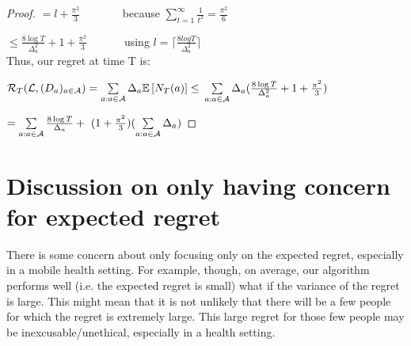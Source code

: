 \documentclass[11pt]{article}
\begin{document}
\begin{proof}
$= l + \frac{\pi^2}{3}$ \ \ \ \ \  \ \ {\small because $\sum\limits^\infty_{t = 1} \frac{1}{t^2} = \frac{\pi^2}{6}$}

$\leq \frac{8 \log T}{\Delta_a^2} + 1 + \frac{\pi^2}{3}$  \ \ \ \  \ \ {\small using $l = \Big \lceil \frac{8logT}{\Delta_a^2} \Big \rceil $} \\

Thus, our regret at time T is:

$\mathcal{R}_T(\mathcal{L}, (D_a)_{a \in \mathcal{A}}) =  \sum\limits_{a: a \in \mathcal{A}} \Delta_a \mathbb{E}\left[ N_T(a) \right] \leq $
$\sum\limits_{a: a \in \mathcal{A}} \Delta_a(\frac{8 \log T}{\Delta_a^2} + 1 + \frac{\pi^2}{3}) $

$ = \sum\limits_{a: a \in \mathcal{A}} \frac{8 \log T}{\Delta_a} + \ (1 + \frac{\pi^2}{3})(\sum\limits_{a: a \in \mathcal{A}} \Delta_a)$  \end{proof}

\section{Discussion on only having concern for expected regret}

There is some concern about only focusing only on the expected regret, especially in a mobile health setting. For example, though, on average, our algorithm performs well (i.e. the expected regret is small) what if the variance of the regret is large.  This might mean that it is not unlikely that there will be a few people for which the regret is extremely large.  This large regret for those few people may be inexcusable/unethical, especially in a health setting.





\end{document}
